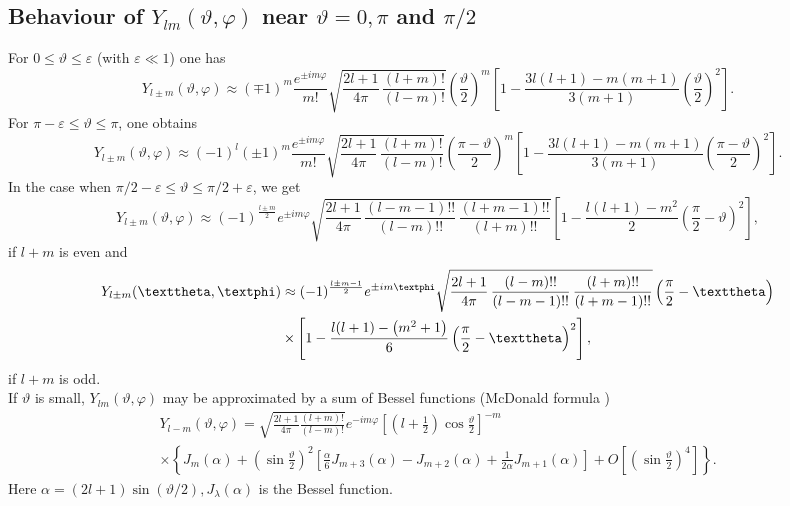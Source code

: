 \subsection{Behaviour of $Y_{l m}(\vartheta, \varphi)$ near $\vartheta=0, \pi$ and $\pi / 2$}\label{sec:5.12.2}
For $0 \leq \vartheta \leq \varepsilon$ (with $\varepsilon \ll 1$) one has
\begin{equation}
Y_{l \pm m}(\vartheta, \varphi) \approx(\mp 1)^{m} \frac{e^{ \pm i m \varphi}}{m!} \sqrt{\frac{2 l+1}{4 \pi} \, \frac{(l+m)!}{(l-m)!}}\left(\frac{\vartheta}{2}\right)^{m}\left[1-\frac{3 l(l+1)-m(m+1)}{3(m+1)}\left(\frac{\vartheta}{2}\right)^{2}\right] . \label{eq:5:12:4}
\end{equation}
For $\pi-\varepsilon \leq \vartheta \leq \pi$, one obtains
\begin{equation}
Y_{l \pm m}(\vartheta, \varphi) \approx(-1)^{l}( \pm 1)^{m} \frac{e^{ \pm i m \varphi}}{m!} \sqrt{\frac{2 l+1}{4 \pi} \, \frac{(l+m)!}{(l-m)!}}\left(\frac{\pi-\vartheta}{2}\right)^{m}\left[1-\frac{3 l(l+1)-m(m+1)}{3(m+1)}\left(\frac{\pi-\vartheta}{2}\right)^{2}\right] . \label{eq:5:12:5}
\end{equation}
In the case when $\pi / 2-\varepsilon \leq \vartheta \leq \pi / 2+\varepsilon$, we get
\begin{equation}
Y_{l \pm m}(\vartheta, \varphi) \approx(-1)^{\frac{l \pm m}{2}} e^{ \pm i m \varphi} \sqrt{\frac{2 l+1}{4 \pi} \, \frac{(l-m-1)!!}{(l-m)!!} \, \frac{(l+m-1)!!}{(l+m)!!}}\left[1-\frac{l(l+1)-m^{2}}{2}\left(\frac{\pi}{2}-\vartheta\right)^{2}\right], \label{eq:5:12:6}
\end{equation}
if $l+m$ is even and
\begin{gather}
Y_{l \pm m}(\vartheta, \varphi) \approx(-1)^{\frac{l \pm m-1}{2}} e^{ \pm i m \varphi} \sqrt{\frac{2 l+1}{4 \pi} \, \frac{(l-m)!!}{(l-m-1)!!} \, \frac{(l+m)!!}{(l+m-1)!!}}\left(\frac{\pi}{2}-\vartheta\right)  \notag\\
\times\left[1-\frac{l(l+1)-\left(m^{2}+1\right)}{6}\left(\frac{\pi}{2}-\vartheta\right)^{2}\right], \label{eq:5:12:7}
\end{gather}
if $l+m$ is odd.\\
If $\vartheta$ is small, $Y_{l m}(\vartheta, \varphi)$ may be approximated by a sum of Bessel functions (McDonald formula \cite{ref004})
\begin{multline}
Y_{l-m}(\vartheta, \varphi)=\sqrt{\frac{2 l+1}{4 \pi} \frac{(l+m)!}{(l-m)!}} e^{-i m \varphi}\left[\left(l+\frac{1}{2}\right) \cos \frac{\vartheta}{2}\right]^{-m}  \\
\times\left\{J_{m}(\alpha)+\left(\sin \frac{\vartheta}{2}\right)^{2}\left[\frac{\alpha}{6} J_{m+3}(\alpha)-J_{m+2}(\alpha)+\frac{1}{2 \alpha} J_{m+1}(\alpha)\right]+O\left[\left(\sin \frac{\vartheta}{2}\right)^{4}\right]\right\}. \label{eq:5:12:8}
\end{multline}
Here $\alpha=(2 l+1) \sin (\vartheta / 2), J_{\lambda}(\alpha)$ is the Bessel function.

